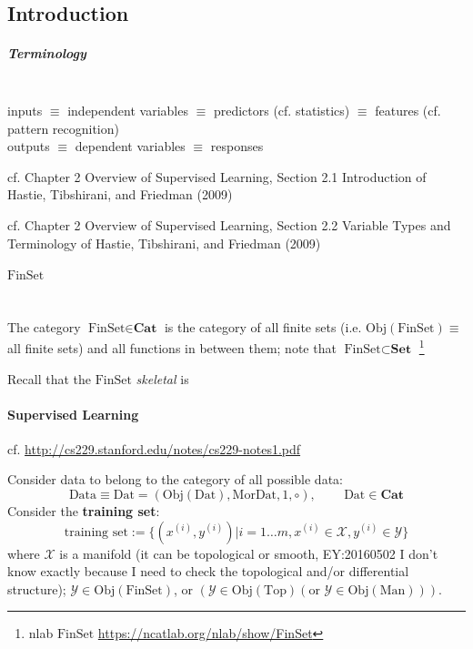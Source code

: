 \documentclass[10pt]{amsart}
\begin{document}
\begin{multicols*}{2}
\part{Introduction}





\subsubsection{Terminology} \quad \\ 
inputs $\equiv $ independent variables $\equiv $ predictors (cf. statistics) $ \equiv $ features (cf. pattern recognition) \\
outputs $\equiv $ dependent variables $\equiv $ responses

cf. Chapter 2 Overview of Supervised Learning, Section 2.1 Introduction of Hastie, Tibshirani, and Friedman (2009) \cite{HTF2009}

cf. Chapter 2 Overview of Supervised Learning, Section 2.2 Variable Types and Terminology  of Hastie, Tibshirani, and Friedman (2009) \cite{HTF2009}

\subsubsection{$\text{FinSet}$} \quad \\ 
The category $\text{FinSet} \in \mathbf{\text{Cat}}$ is the category of all finite sets (i.e. $\text{Obj}(\text{FinSet}) \equiv $ all finite sets) and all functions in between them; note that $\text{FinSet} \subset \mathbf{\text{Set}}$ \footnote{nlab $\text{FinSet}$ \url{https://ncatlab.org/nlab/show/FinSet}}

Recall that the $\text{FinSet}$ \emph{skeletal} is


\subsection{Supervised Learning}

cf. \url{http://cs229.stanford.edu/notes/cs229-notes1.pdf}

Consider data to belong to the category of all possible data:
\[
\text{Data} \equiv \text{Dat} = (\text{Obj}(\text{Dat}), \text{Mor}\text{Dat}, 1, \circ), \qquad \, \text{Dat} \in \mathbf{\text{Cat}}
\]
Consider the \textbf{training set}:
\[
\text{training set} := \lbrace (x^{(i)},y^{(i)}) | i  =1 \dots m , x^{(i)} \in \mathcal{X}, y^{(i)} \in \mathcal{Y} \rbrace
\]
where $\mathcal{X}$ is a manifold (it can be topological or smooth, EY:20160502 I don't know exactly because I need to check the topological and/or differential structure); $\mathcal{Y} \in \text{Obj}(\text{FinSet})$, or $(\mathcal{Y} \in \text{Obj}(\text{Top}) (\text{or } \mathcal{Y} \in \text{Obj}(\text{Man})))$.  


\end{multicols*}
\end{document}
